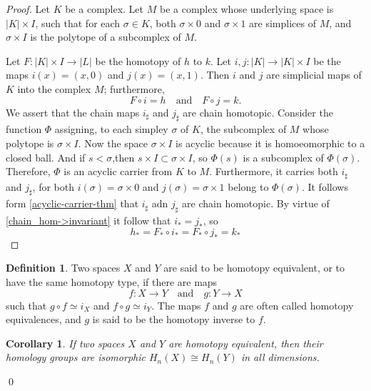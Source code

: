 \documentclass[draft,toc=bib]{scrartcl}
\theoremstyle{plain}
\newtheorem{corollary}[theorem]{Corollary}
\theoremstyle{definition}
\newtheorem	{definition}[theorem]{Definition}
\theoremstyle{remark}
\newcommand{\isom}{\cong}
\newcommand{\qandq}{\quad \text{and} \quad}
\begin{document}
\begin{proof}
	Let $K$ be a complex. Let $M$ be a complex whose underlying space is $|K|\times I$, such that for each $\sigma\in K$, both $\sigma\times 0$ and $\sigma\times 1$ are simplices of $M$, and $\sigma \times I$ is the polytope of a subcomplex of $M$.
	
	Let $F:|K|\times I\to |L|$ be the homotopy of $h$ to $k$. Let $i,j: |K|\to |K|\times I$ be the maps $i(x)=(x,0)$ and $j(x)=(x,1)$. Then $i$ and $j$ are simplicial maps of $K$ into the complex $M$; furthermore,
	\[
	F\circ i=h\qandq F\circ j=k.
	\]
	We assert that the chain maps $i_\sharp$ and $j_\sharp$ are chain homotopic. Consider the function $\Phi$ assigning, to each simpley $\sigma$ of $K$, the subcomplex of $M$ whose polytope is $\sigma \times I$. Now the space $\sigma\times I$ is acyclic because it is homoeomorphic to a closed ball. And if $s<\sigma$,then $s\times I\subset\sigma\times I$, so $\Phi(s)$ is a subcomplex of $\Phi(\sigma)$. Therefore, $\Phi$ is an acyclic carrier from $K$ to $M$. Furthermore, it carries both $i_\sharp$ and $j_\sharp$, for both $i(\sigma)=\sigma\times 0$ and $j(\sigma)=\sigma\times 1$ belong to $\Phi(\sigma)$. It follows form \autoref{acyclic-carrier-thm} that $i_\sharp$ adn $j_\sharp$ are chain homotopic. By virtue of \autoref{chain_hom->invariant} it follow that $i_\ast=j_\ast$, so 
	\[
	h_\ast=F_\ast\circ i_\ast=F_\ast\circ j_\ast=k_\ast
	\]
	\end{proof}


\begin{definition}\label{def:hom-eq}
	Two spaces $X$ and $Y$ are said to be homotopy equivalent, or to have the same homotopy type, if there are maps\[
	f: X\to Y\qandq g:Y\to X
	\]
	such that $g\circ f\simeq i_X$ and $f\circ g\simeq i_Y$. The maps $f$ and $g$ are often called homotopy equivalences, and $g$ is said to be the homotopy inverse to $f$.
\end{definition}

\begin{corollary}
	If two spaces $X$ and $Y$ are homotopy equivalent, then their homology groups are isomorphic $H_n(X)\isom H_n(Y)$ in all dimensions.
\end{corollary}\qed



\printbibliography
\end{document}
